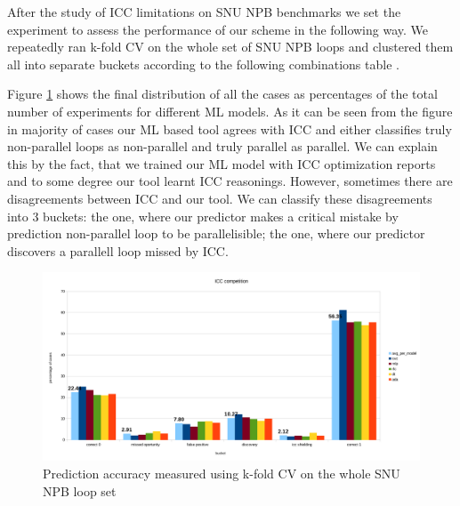 \documentclass[sigconf,10pt,review,anonymous]{acmart}
\begin{document}
After the study of ICC limitations on SNU NPB benchmarks we set the experiment to assess the performance of our scheme in the following way. We repeatedly ran k-fold CV on the whole set of SNU NPB loops and clustered them all into separate buckets according to the following combinations table .

Figure \ref{fig:icc_competition} shows the final distribution of all the cases as percentages of the total number of experiments for different ML models. As it can be seen from the figure in majority of cases our ML based tool agrees with ICC and either classifies truly non-parallel loops as non-parallel and truly parallel as parallel. We can explain this by the fact, that we trained our ML model with ICC optimization reports and to some degree our tool learnt ICC reasonings. However, sometimes there are disagreements between ICC and our tool. We can classify these disagreements into 3 buckets: the one, where our predictor makes a critical mistake by prediction non-parallel loop to be parallelisible; the one, where our predictor discovers a parallell loop missed by ICC.       

\begin{figure}[t!]
\centering
\includegraphics[width=\textwidth]{figures/icc_competition.pdf}
\caption{Prediction accuracy measured using k-fold CV on the whole SNU NPB loop set}
\label{fig:icc_competition}
\end{figure}
\end{document}
